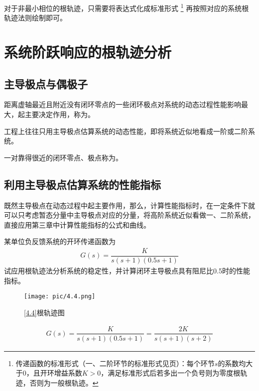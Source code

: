 对于非最小相位的根轨迹，只需要将表达式化成标准形式
\footnote[1]{传递函数的标准形式（一、二阶环节的标准形式见\pageref{一阶系统的标准形式}页）：每个环节$s$的系数均大于0，且开环增益系数$K>0$，满足标准形式后若多出一个负号则为零度根轨迹，否则为一般根轨迹。}
再按照对应的系统根轨迹法则绘制即可。


\section{系统阶跃响应的根轨迹分析}

\subsection{主导极点与偶极子}
\tdefination[主导极点]
距离虚轴最近且附近没有闭环零点的一些闭环极点对系统的动态过程性能影响最大，起主要决定作用，称为。

工程上往往只用主导极点估算系统的动态性能，即将系统近似地看成一阶或二阶系统。
\vspace*{0.5em}

一对靠得很近的闭环零点、极点称为。
\vspace*{1em}

\subsection{利用主导极点估算系统的性能指标}
既然主导极点在动态过程中起主要作用，那么，计算性能指标时，在一定条件下就可以只考虑暂态分量中主导极点对应的分量，将高阶系统近似看做一、二阶系统，直接应用第三章中计算性能指标的公式和曲线。

\examples \label{4.4}某单位负反馈系统的开环传递函数为
\begin{align*}
	G(s) = \dfrac{K}{s(s + 1)(0.5s + 1)}
\end{align*}
试应用根轨迹法分析系统的稳定性，并计算闭环主导极点具有阻尼比0.5时的性能指标。
\begin{figure}[!htb]
	\centering
	\texttt{[image: pic/4.4.png]}
	\vspace*{-1.2em}
	\caption{\ref{4.4}根轨迹图}
	\label{F4.4}
	\vspace*{-0.5em}
\end{figure}

\solve 
\vspace*{-2.9em}
\begin{align*}
	G(s) = \dfrac{K}{s(s + 1)(0.5s + 1)} = \dfrac{2K}{s(s + 1)(s + 2)}
\end{align*}

